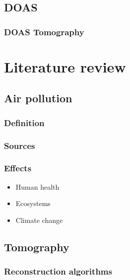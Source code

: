 \subsection{DOAS}%
\label{sub:doas}

\subsubsection{DOAS Tomography}%
\label{ssub:doas_tomography}

\section{Literature review}%
\label{sec:literature_review}

\subsection{Air pollution}%
\label{sub:air_pollution}

\subsubsection{Definition}%
\label{ssub:definition}

\subsubsection{Sources}%
\label{ssub:sources}

\subsubsection{Effects}%
\label{ssub:effects}
\begin{itemize}
    \item Human health
    \item Ecosystems
    \item Climate change
\end{itemize}

\subsection{Tomography}%
\label{sub:tomography}

\subsubsection{Reconstruction algorithms}%
\label{ssub:reconstruction_algorithms}

